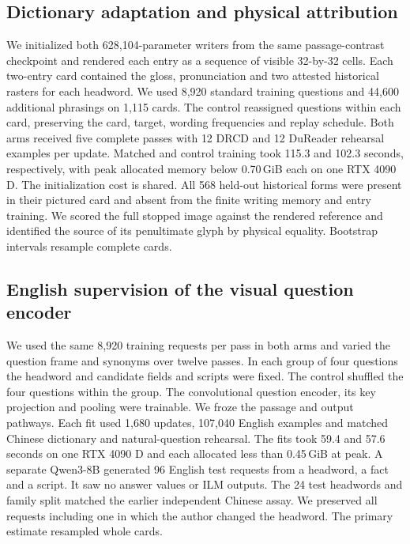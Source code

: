 \documentclass[12pt,a4paper]{article}
\providecommand{\DIFadd}[1]{{\protect\color{blue} \sf #1}} %
\begin{document}
\subsection*{\DIFadd{Dictionary adaptation and physical attribution}}
\DIFadd{We initialized both 628,104-parameter writers from the same passage-contrast checkpoint and rendered each entry as a sequence of visible 32-by-32 cells. Each two-entry card contained the gloss, pronunciation and two attested historical rasters for each headword. We used 8,920 standard training questions and 44,600 additional phrasings on 1,115 cards. The control reassigned questions within each card, preserving the card, target, wording frequencies and replay schedule. Both arms received five complete passes with 12 DRCD and 12 DuReader rehearsal examples per update. Matched and control training took 115.3 and 102.3 seconds, respectively, with peak allocated memory below 0.70\,GiB each on one RTX 4090 D. The initialization cost is shared. All 568 held-out historical forms were present in their pictured card and absent from the finite writing memory and entry training. We scored the full stopped image against the rendered reference and identified the source of its penultimate glyph by physical equality. Bootstrap intervals resample complete cards.
}

\subsection*{\DIFadd{English supervision of the visual question encoder}}
\DIFadd{We used the same 8,920 training requests per pass in both arms and varied the question frame and synonyms over twelve passes. In each group of four questions the headword and candidate fields and scripts were fixed. The control shuffled the four questions within the group. The convolutional question encoder, its key projection and pooling were trainable. We froze the passage and output pathways. Each fit used 1,680 updates, 107,040 English examples and matched Chinese dictionary and natural-question rehearsal. The fits took 59.4 and 57.6 seconds on one RTX 4090 D and each allocated less than 0.45\,GiB at peak. A separate Qwen3-8B generated 96 English test requests from a headword, a fact and a script. It saw no answer values or ILM outputs. The 24 test headwords and family split matched the earlier independent Chinese assay. We preserved all requests including one in which the author changed the headword. The primary estimate resampled whole cards.
}
\end{document}
